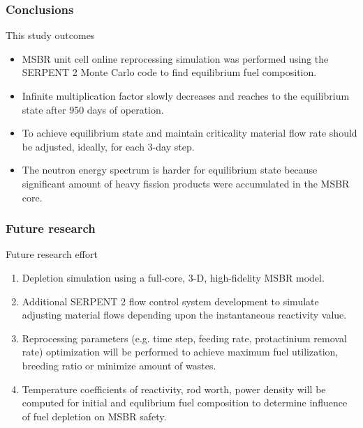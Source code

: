 \begin{frame}
  \frametitle{Conclusions}
        \begin{block}{This study outcomes}
        \begin{itemize}
                \item \gls{MSBR} unit cell online reprocessing simulation was performed using the SERPENT 2 Monte Carlo code to find equilibrium fuel composition.
                \item Infinite multiplication factor slowly decreases and reaches to the equilibrium state after 950 days of operation.
                \item To achieve equilibrium state and maintain criticality material flow rate should be adjusted, ideally, for each 3-day step.
                \item The neutron energy spectrum is harder for equilibrium state because significant amount of heavy fission products were accumulated in the \gls{MSBR} core.
        \end{itemize}
        \end{block}
        
\end{frame}

\begin{frame}
  \frametitle{Future research}
         
              \begin{block}{Future research effort}
                 \begin{enumerate}
                \item Depletion simulation using a full-core, 3-D, high-fidelity MSBR model.
                \item Additional SERPENT 2 flow control system development to simulate adjusting material flows depending upon the instantaneous reactivity value.
                \item Reprocessing parameters (e.g. time step, feeding rate, protactinium removal rate) optimization will be performed to achieve maximum fuel utilization, breeding ratio or minimize amount of wastes.
                \item Temperature coefficients of reactivity, rod worth, power density will be computed for initial and equlibrium fuel composition to determine influence of fuel depletion on \gls{MSBR} safety.
               \end{enumerate}
               \end{block}
\end{frame}
